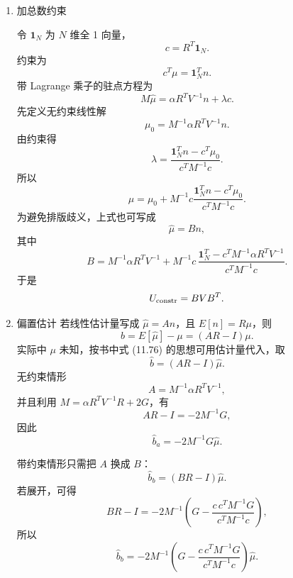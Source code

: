\begin{question}
\begin{solution}
\begin{enumerate}
\item 加总数约束

令 \(\mathbf 1_N\) 为 \(N\) 维全 1 向量，
\[
c=R^T\mathbf 1_N.
\]
约束为
\[
c^T\mu=\mathbf 1_N^Tn.
\]
带 Lagrange 乘子的驻点方程为
\[
M\hat\mu=\alpha R^TV^{-1}n+\lambda c.
\]
先定义无约束线性解
\[
\mu_0=M^{-1}\alpha R^TV^{-1}n.
\]
由约束得
\[
\lambda=
\frac{\mathbf 1_N^Tn-c^T\mu_0}{c^TM^{-1}c}.
\]
所以
\[
\hat\mu
=\mu_0+M^{-1}c\frac{\mathbf 1_N^Tn-c^T\mu_0}{c^TM^{-1}c}.
\]
为避免排版歧义，上式也可写成
\[
\hat\mu=Bn,
\]
其中
\[
B=M^{-1}\alpha R^TV^{-1}
+M^{-1}c\,
\frac{\mathbf 1_N^T-c^TM^{-1}\alpha R^TV^{-1}}{c^TM^{-1}c}.
\]
于是
\[
U_{\rm constr}=BVB^T.
\]

\item 偏置估计
若线性估计量写成 \(\hat\mu=An\)，且 \(E[n]=R\mu\)，则
\[
b=E[\hat\mu]-\mu=(AR-I)\mu.
\]
实际中 \(\mu\) 未知，按书中式 (11.76) 的思想可用估计量代入，取
\[
\hat b=(AR-I)\hat\mu.
\]
无约束情形
\[
A=M^{-1}\alpha R^TV^{-1},
\]
并且利用 \(M=\alpha R^TV^{-1}R+2G\)，有
\[
AR-I=-2M^{-1}G,
\]
因此
\[
\hat b_a=-2M^{-1}G\hat\mu.
\]

带约束情形只需把 \(A\) 换成 \(B\)：
\[
\hat b_b=(BR-I)\hat\mu.
\]
若展开，可得
\[
BR-I=-2M^{-1}
\left(
G-\frac{c\,c^TM^{-1}G}{c^TM^{-1}c}
\right),
\]
所以
\[
\hat b_b=-2M^{-1}
\left(
G-\frac{c\,c^TM^{-1}G}{c^TM^{-1}c}
\right)\hat\mu.
\]
\end{enumerate}
\end{solution}
\end{question}

